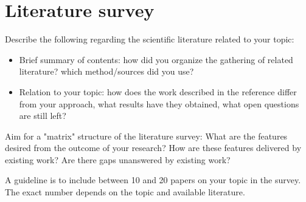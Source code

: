 \section{Literature survey}
Describe the following regarding the scientific literature related to your topic:
\begin{itemize}
    \item 	Brief summary of contents: how did you organize the gathering of related literature? which method/sources did you use?
	\item	Relation to your topic: how does the work described in the reference differ from your approach, what results have they obtained, what open questions are still left?
\end{itemize}
Aim for a "matrix" structure of the literature survey: What are the features desired from the outcome of your research? How are these features delivered by existing work? Are there gaps unanswered by existing work? 

A guideline is to include between 10 and 20 papers on your topic in the survey. The exact number depends on the topic and available literature.
